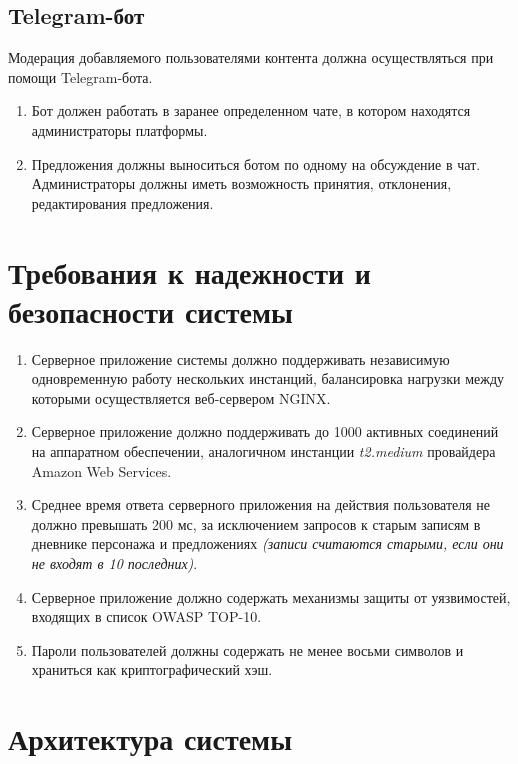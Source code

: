 \documentclass[12pt, a4paper]{article}
\begin{document}
\subsection{Telegram-бот}
\label{telegram-bot}

Модерация добавляемого пользователями контента должна осуществляться
при помощи Telegram-бота.

\begin{enumerate}
\item Бот должен работать в заранее определенном чате, в котором находятся администраторы платформы.
\item Предложения должны выноситься ботом по одному на обсуждение в чат. Администраторы должны иметь возможность принятия, отклонения, редактирования предложения. 
\end{enumerate}

\section{Требования к надежности и безопасности системы}

\begin{enumerate}
\item Серверное приложение системы должно поддерживать независимую
  одновременную работу нескольких инстанций, балансировка нагрузки между
  которыми осуществляется веб-сервером NGINX.
\item Серверное приложение должно поддерживать до 1000 активных соединений на
  аппаратном обеспечении, аналогичном инстанции \textit{t2.medium} провайдера
  Amazon Web Services.
\item Среднее время ответа серверного приложения на действия пользователя
  не должно превышать 200 мс, за исключением запросов к старым записям
  в дневнике персонажа и предложениях \textit{(записи считаются старыми,
  если они не входят в 10 последних)}.
\item Серверное приложение должно содержать механизмы защиты от уязвимостей,
  входящих в список OWASP TOP-10.
\item Пароли пользователей должны содержать не менее восьми символов и
  храниться как криптографический хэш.
\end{enumerate}

\section{Архитектура системы}
\end{document}
